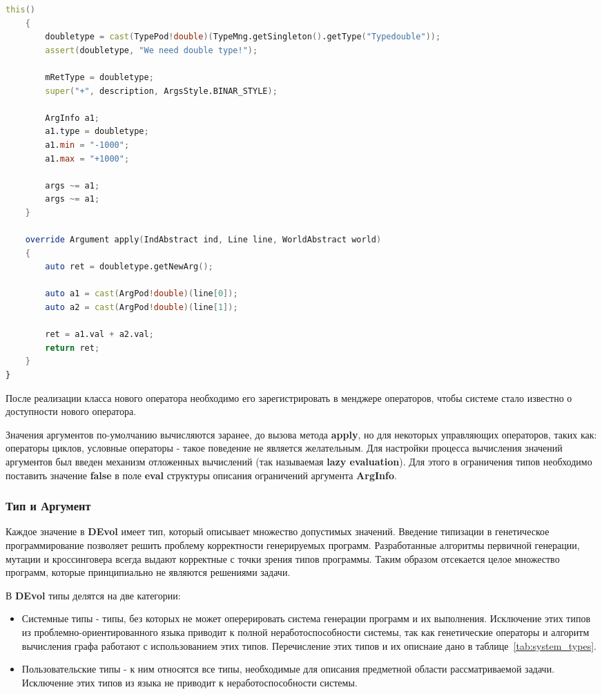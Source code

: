 \documentclass[russian,utf8,emptystyle]{eskdtext}
\begin{document}
\begin{spacing}{1.5}
\begin{lstlisting}[language=D]
    this()
    {
        doubletype = cast(TypePod!double)(TypeMng.getSingleton().getType("Typedouble"));
        assert(doubletype, "We need double type!");
        
        mRetType = doubletype;
        super("+", description, ArgsStyle.BINAR_STYLE);
        
        ArgInfo a1;
        a1.type = doubletype;
        a1.min = "-1000";
        a1.max = "+1000";
        
        args ~= a1;
        args ~= a1;
    }
    
    override Argument apply(IndAbstract ind, Line line, WorldAbstract world)
    {
        auto ret = doubletype.getNewArg();
        
        auto a1 = cast(ArgPod!double)(line[0]);
        auto a2 = cast(ArgPod!double)(line[1]);
        
        ret = a1.val + a2.val;
        return ret;
    }   
}
\end{lstlisting}
После реализации класса нового оператора необходимо его зарегистрировать в менджере операторов, чтобы системе стало известно о доступности нового оператора.

Значения аргументов по-умолчанию вычисляются заранее, до вызова метода \textbf{apply}, но для некоторых управляющих операторов, таких как: операторы циклов, условные операторы - такое поведение не является желательным. Для настройки процесса вычисления значений аргументов был введен механизм отложенных вычислений (так называемая \textbf{lazy evaluation}). Для этого в ограничения типов необходимо поставить значение \textbf{false} в поле \textbf{eval} структуры описания ограничений аргумента \textbf{ArgInfo}.

\subsubsection{Тип и Аргумент}
Каждое значение в \textbf{DEvol} имеет тип, который описывает множество допустимых значений. Введение типизации в генетическое программирование позволяет решить проблему корректности генерируемых программ. Разработанные алгоритмы первичной генерации, мутации и кроссинговера всегда выдают корректные с точки зрения типов программы. Таким образом отсекается целое множество программ, которые принципиально не являются решениями задачи.

В \textbf{DEvol} типы делятся на две категории:
\begin{itemize}
\item Системные типы - типы, без которых не может оперерировать система генерации программ и их выполнения. Исключение этих типов из проблемно-ориентированного языка приводит к полной неработоспособности системы, так как генетические операторы и алгоритм вычисления графа работают с использованием этих типов. Перечисление этих типов и их описнаие дано в таблице~\ref{tab:system_types}.
\item Пользовательские типы - к ним относятся все типы, необходимые для описания предметной области рассматриваемой задачи. Исключение этих типов из языка не приводит к неработоспособности системы.
\end{itemize}


\end{spacing}
\end{document}
